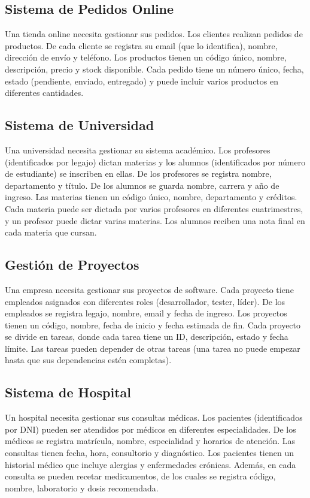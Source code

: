 \documentclass[12pt]{article}
\begin{document}
\subsection{Sistema de Pedidos Online}
Una tienda online necesita gestionar sus pedidos. Los clientes realizan pedidos de productos. De cada cliente se registra su email (que lo identifica), nombre, dirección de envío y teléfono. Los productos tienen un código único, nombre, descripción, precio y stock disponible. Cada pedido tiene un número único, fecha, estado (pendiente, enviado, entregado) y puede incluir varios productos en diferentes cantidades.

\subsection{Sistema de Universidad}
Una universidad necesita gestionar su sistema académico. Los profesores (identificados por legajo) dictan materias y los alumnos (identificados por número de estudiante) se inscriben en ellas. De los profesores se registra nombre, departamento y título. De los alumnos se guarda nombre, carrera y año de ingreso. Las materias tienen un código único, nombre, departamento y créditos. Cada materia puede ser dictada por varios profesores en diferentes cuatrimestres, y un profesor puede dictar varias materias. Los alumnos reciben una nota final en cada materia que cursan.

\subsection{Gestión de Proyectos}
Una empresa necesita gestionar sus proyectos de software. Cada proyecto tiene empleados asignados con diferentes roles (desarrollador, tester, líder). De los empleados se registra legajo, nombre, email y fecha de ingreso. Los proyectos tienen un código, nombre, fecha de inicio y fecha estimada de fin. Cada proyecto se divide en tareas, donde cada tarea tiene un ID, descripción, estado y fecha límite. Las tareas pueden depender de otras tareas (una tarea no puede empezar hasta que sus dependencias estén completas).

\subsection{Sistema de Hospital}
Un hospital necesita gestionar sus consultas médicas. Los pacientes (identificados por DNI) pueden ser atendidos por médicos en diferentes especialidades. De los médicos se registra matrícula, nombre, especialidad y horarios de atención. Las consultas tienen fecha, hora, consultorio y diagnóstico. Los pacientes tienen un historial médico que incluye alergias y enfermedades crónicas. Además, en cada consulta se pueden recetar medicamentos, de los cuales se registra código, nombre, laboratorio y dosis recomendada.
\end{document}
